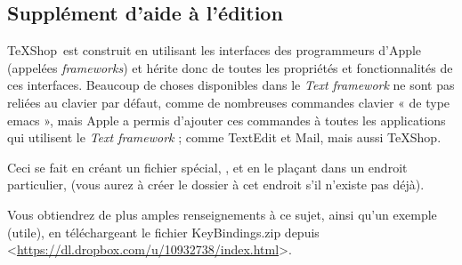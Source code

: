 \documentclass[11pt,french]{article}
\newcommand{\TS}{\textsf{\TeX Shop}}
\newcommand{\cmd}[1]{\textsf{#1}}
\begin{document}
\subsection{Supplément d'aide à l'édition}

\TS\ est construit en utilisant les interfaces des programmeurs d'Apple (appelées \emph{frameworks}) et hérite donc de toutes les propriétés et fonctionnalités de ces interfaces. Beaucoup de choses disponibles dans le \emph{Text framework} ne sont pas reliées au clavier par défaut, comme de nombreuses commandes clavier « de type \cmd{emacs} », mais Apple a permis d'ajouter ces commandes à toutes les applications qui utilisent le \emph{Text framework} ; comme \textsf{TextEdit} et \textsf{Mail}, mais aussi \TS.

Ceci se fait en créant un fichier spécial, , et en le plaçant dans un endroit particulier,  (vous aurez à créer le dossier  à cet endroit s'il n'existe pas déjà).

Vous obtiendrez de plus amples renseignements à ce sujet, ainsi qu'un exemple (utile), en téléchargeant le fichier \textsf{KeyBindings.zip} depuis <\url{https://dl.dropbox.com/u/10932738/index.html}>.

%
%

\end{document}
